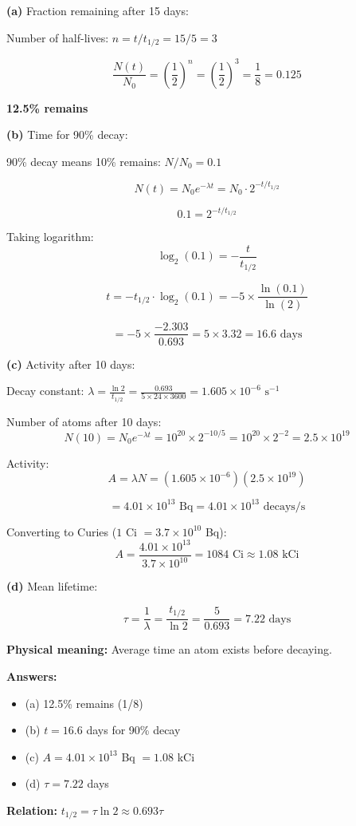 \documentclass[12pt,a4paper]{article}
\begin{document}
\begin{solution}
\textbf{(a)} Fraction remaining after 15 days:

Number of half-lives: $n = t/t_{1/2} = 15/5 = 3$

$$\frac{N(t)}{N_0} = \left(\frac{1}{2}\right)^n = \left(\frac{1}{2}\right)^3 = \frac{1}{8} = 0.125$$

\textbf{12.5\% remains}

\textbf{(b)} Time for 90\% decay:

90\% decay means 10\% remains: $N/N_0 = 0.1$

$$N(t) = N_0 e^{-\lambda t} = N_0 \cdot 2^{-t/t_{1/2}}$$

$$0.1 = 2^{-t/t_{1/2}}$$

Taking logarithm:
$$\log_{2}(0.1) = -\frac{t}{t_{1/2}}$$

$$t = -t_{1/2} \cdot \log_{2}(0.1) = -5 \times \frac{\ln(0.1)}{\ln(2)}$$

$$= -5 \times \frac{-2.303}{0.693} = 5 \times 3.32 = 16.6\text{ days}$$

\textbf{(c)} Activity after 10 days:

Decay constant: $\lambda = \frac{\ln 2}{t_{1/2}} = \frac{0.693}{5 \times 24 \times 3600} = 1.605 \times 10^{-6}\text{ s}^{-1}$

Number of atoms after 10 days:
$$N(10) = N_0 e^{-\lambda t} = 10^{20} \times 2^{-10/5} = 10^{20} \times 2^{-2} = 2.5 \times 10^{19}$$

Activity:
$$A = \lambda N = (1.605 \times 10^{-6})(2.5 \times 10^{19})$$

$$= 4.01 \times 10^{13}\text{ Bq} = 4.01 \times 10^{13}\text{ decays/s}$$

Converting to Curies ($1$ Ci $= 3.7 \times 10^{10}$ Bq):
$$A = \frac{4.01 \times 10^{13}}{3.7 \times 10^{10}} = 1084\text{ Ci} \approx 1.08\text{ kCi}$$

\textbf{(d)} Mean lifetime:

$$\tau = \frac{1}{\lambda} = \frac{t_{1/2}}{\ln 2} = \frac{5}{0.693} = 7.22\text{ days}$$

\textbf{Physical meaning:} Average time an atom exists before decaying.

\textbf{Answers:}
\begin{itemize}
    \item (a) 12.5\% remains (1/8)
    \item (b) $t = 16.6$ days for 90\% decay
    \item (c) $A = 4.01 \times 10^{13}$ Bq $= 1.08$ kCi
    \item (d) $\tau = 7.22$ days
\end{itemize}

\textbf{Relation:} $t_{1/2} = \tau \ln 2 \approx 0.693\tau$
\end{solution}
\end{document}
